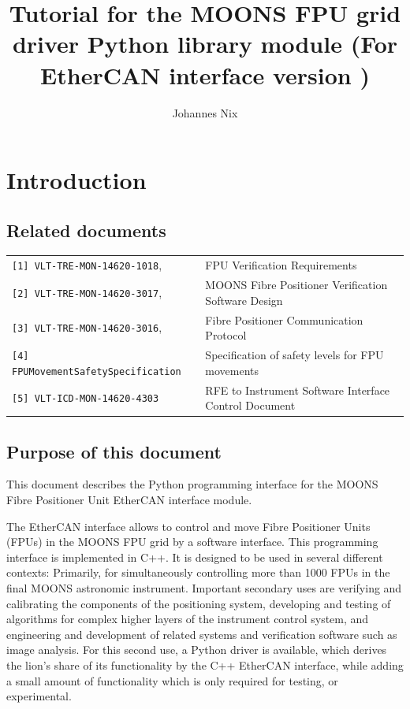 \documentclass[11pt,a4paper]{report}
\begin{document}
\title{Tutorial for the MOONS FPU grid driver Python library
  module (For EtherCAN interface version ) }


\author{Johannes Nix}

\maketitle

\tableofcontents


\section{Introduction}
\subsection{Related documents}

\begin{tabular}{|ll|}
  \hline
\verb+[1] VLT-TRE-MON-14620-1018+, &  FPU Verification Requirements \\
\verb+[2] VLT-TRE-MON-14620-3017+, & MOONS Fibre Positioner Verification Software Design \\
\verb+[3] VLT-TRE-MON-14620-3016+, & Fibre Positioner Communication Protocol\\
\verb+[4] FPUMovementSafetySpecification+ & Specification of safety levels for FPU movements\\
\verb+[5] VLT-ICD-MON-14620-4303+ & RFE to Instrument Software Interface Control Document \\
\hline
\end{tabular}


\subsection{Purpose of this document}
This document describes the Python programming interface for the MOONS
Fibre Positioner Unit EtherCAN interface module.

The EtherCAN interface allows to control and move Fibre Positioner
Units (FPUs) in the MOONS FPU grid by a software interface. This
programming interface is implemented in C++. It is designed to be used
in several different contexts: Primarily, for simultaneously
controlling more than 1000 FPUs in the final MOONS astronomic
instrument. Important secondary uses are verifying and calibrating the
components of the positioning system, developing and testing of
algorithms for complex higher layers of the instrument control system,
and engineering and development of related systems and verification
software such as image analysis. For this second use, a Python driver
is available, which derives the lion's share of its functionality by
the C++ EtherCAN interface, while adding a small amount of
functionality which is only required for testing, or experimental.
\end{document}
